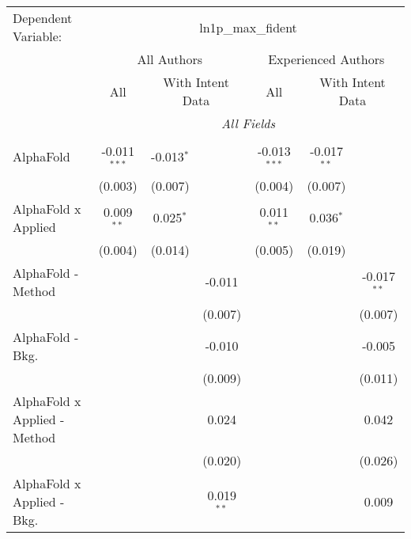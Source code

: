\begingroup
\centering
\begin{tabular}{lcccccc}
   \tabularnewline \midrule \midrule
   Dependent Variable: & \multicolumn{6}{c}{ln1p\_max\_fident}\\
 & \multicolumn{3}{c}{All Authors} & \multicolumn{3}{c}{Experienced Authors} \\
\cmidrule(lr){2-4} \cmidrule(lr){5-7}
 & \multicolumn{1}{c}{All} & \multicolumn{2}{c}{With Intent Data} & \multicolumn{1}{c}{All} & \multicolumn{2}{c}{With Intent Data} \\
\cmidrule(lr){2-2} \cmidrule(lr){3-4} \cmidrule(lr){5-5} \cmidrule(lr){6-7}
 & \multicolumn{6}{c}{\textit{All Fields}} \\ \\
   AlphaFold                      & -0.011$^{***}$ & -0.013$^{*}$ &               & -0.013$^{***}$ & -0.017$^{**}$ &   \\   
                                  & (0.003)        & (0.007)      &               & (0.004)        & (0.007)       &   \\   
   AlphaFold x Applied            & 0.009$^{**}$   & 0.025$^{*}$  &               & 0.011$^{**}$   & 0.036$^{*}$   &   \\   
                                  & (0.004)        & (0.014)      &               & (0.005)        & (0.019)       &   \\   
   AlphaFold - Method             &                &              & -0.011        &                &               & -0.017$^{**}$\\   
                                  &                &              & (0.007)       &                &               & (0.007)\\   
   AlphaFold - Bkg.               &                &              & -0.010        &                &               & -0.005\\   
                                  &                &              & (0.009)       &                &               & (0.011)\\   
   AlphaFold x Applied - Method   &                &              & 0.024         &                &               & 0.042\\   
                                  &                &              & (0.020)       &                &               & (0.026)\\   
   AlphaFold x Applied - Bkg.     &                &              & 0.019$^{**}$  &                &               & 0.009\\   

\end{tabular}

